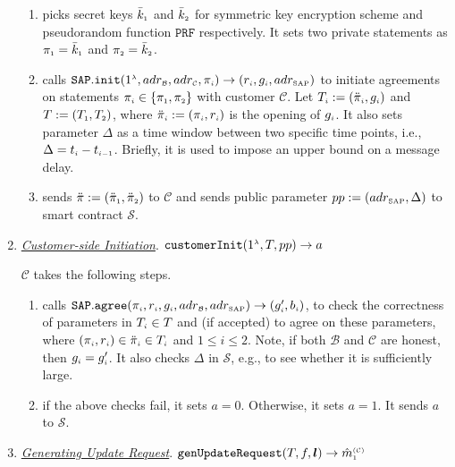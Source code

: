 \begin{enumerate}
\begin{enumerate}
\item\label{RCPoRP::setup} picks   secret keys $\bar k_{\scriptscriptstyle 1}$ and $\bar k_{\scriptscriptstyle 2}$ for  symmetric key encryption scheme and  pseudorandom function $\mathtt{PRF}$ respectively. It  sets two private statements as $\pi_{\scriptscriptstyle 1}=\bar k_{\scriptscriptstyle 1}$ and $\pi_{\scriptscriptstyle 2}= \bar k_{\scriptscriptstyle 2}$.
%
\item\label{RCPoRP::set-qp}  calls $\mathtt{SAP.init}(1^{\scriptscriptstyle\lambda}, adr_{\scriptscriptstyle\mathcal{B}}, adr_{\scriptscriptstyle\mathcal{C}}, \pi_{\scriptscriptstyle i})\rightarrow(r_{
\scriptscriptstyle i}, g_{\scriptscriptstyle i}, adr_{\scriptscriptstyle\text{SAP}})$ to initiate  agreements on  statements $\pi_{\scriptscriptstyle i}\in \{\pi_{\scriptscriptstyle 1}, \pi_{\scriptscriptstyle 2}\}$  with customer $\mathcal{C}$.  Let $T_{\scriptscriptstyle i}:=(\ddot{\pi}_{\scriptscriptstyle i}, g_{\scriptscriptstyle i})$ and $T:=(T_{\scriptscriptstyle 1}, T_{\scriptscriptstyle 2})$,  where  $\ddot{\pi}_{\scriptscriptstyle i}:=(\pi_{\scriptscriptstyle i}, r_{\scriptscriptstyle i})$ is the opening of $g_{\scriptscriptstyle i}$.  It also sets parameter $\Delta$ as a time window between two specific time points, i.e., $\Delta=t_{\scriptscriptstyle i} - t_{\scriptscriptstyle i-1}$. Briefly, it is used to impose an upper bound on a message delay.  %
%
\item sends $\ddot{\pi}:=(\ddot{\pi}_{\scriptscriptstyle 1}, \ddot{\pi}_{\scriptscriptstyle 2})$ to   $\mathcal{C}$ and   sends  public parameter $pp:=(adr_{\scriptscriptstyle\text{SAP}},\Delta)$ to  smart contract $\mathcal{S}$.
%
\end{enumerate}


\vspace{2mm}
\item \underline{\textit{Customer-side Initiation}}\label{RCSP::Server-side-Initiation}. $\mathtt{customerInit} (1^{\scriptscriptstyle \lambda}, T, pp)\rightarrow a$

$\mathcal{C}$ takes the following steps. 

\begin{enumerate}
%
\item calls   $\mathtt{SAP.agree}(\pi_{\scriptscriptstyle i}, r_{\scriptscriptstyle i}, g_{\scriptscriptstyle i}, adr_{\scriptscriptstyle\mathcal{B}}, adr_{\scriptscriptstyle\text{SAP}})\rightarrow (g'_{\scriptscriptstyle i}, b_{\scriptscriptstyle i})$, to check the correctness of parameters in $T_{\scriptscriptstyle i}\in T$ and (if accepted) to agree on these parameters, where $(\pi_{\scriptscriptstyle i}, r_{\scriptscriptstyle i}) \in \ddot{\pi}_{\scriptscriptstyle i}\in T_{\scriptscriptstyle i}$ and $1\leq i \leq 2$. Note,  if both $\mathcal{B}$ and $\mathcal{C}$ are honest, then $g_{\scriptscriptstyle i}=g'_{\scriptscriptstyle i}$. It also checks $\Delta$ in  $\mathcal{S}$, e.g., to see whether it is sufficiently large.
%
\item if the above checks fail,  it sets $a=0$. Otherwise, it sets $a=1$. It sends $a$ to $\mathcal{S}$. 
\end{enumerate}
%
\vspace{2mm}
\item \underline{\textit{Generating  Update Request}}. $\mathtt{genUpdateRequest}(T, f, {\bm l})\rightarrow \hat m^{\scriptscriptstyle\mathcal{(C)}}_{\scriptscriptstyle 1}$


\end{enumerate}
